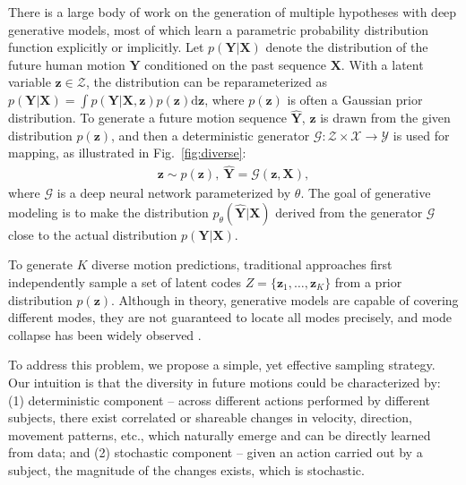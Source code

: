 There is a large body of work on the generation of multiple hypotheses with deep generative models, most of which learn a parametric probability distribution function explicitly or implicitly. Let $p(\mathbf{Y}|\mathbf{X})$ denote the distribution of the future human motion $\mathbf{Y}$ conditioned on the past sequence $\mathbf{X}$. With a latent variable $\mathbf z \in \mathcal{Z}$, the distribution can be reparameterized as $p(\mathbf{Y}|\mathbf{X}) = \int p(\mathbf{Y}|\mathbf{X},\mathbf z)p(\mathbf z) \mathrm{d} \mathbf z$, where $p(\mathbf z)$ is often a Gaussian prior distribution. To generate a future motion sequence $\mathbf{\widehat Y}$, $\mathbf{z}$ is drawn from the given distribution $p(\mathbf z)$, and then a deterministic generator $\mathcal{G}:\mathcal{Z}\times \mathcal{X} \rightarrow \mathcal{Y}$ is used for mapping, as illustrated in Fig.~\ref{fig:diverse}{\color{red}{(a)}}: 
\begin{align}
    \mathbf{z} \sim p(\mathbf{z}), \ \mathbf{\widehat Y} = \mathcal{G}(\mathbf{z}, \mathbf{X}),
\end{align}
where $\mathcal{G}$ is a deep neural network parameterized by $\theta$. The goal of generative modeling is to make the distribution $p_{\theta}(\mathbf{\widehat Y}|\mathbf{X})$ derived from the generator $\mathcal{G}$ close to the actual distribution $p(\mathbf{Y}|\mathbf{X})$. 

To generate $K$ diverse motion predictions, traditional approaches first independently sample a set of latent codes $Z = \{\mathbf{z}_1, \ldots, \mathbf{z}_K\}$ from a prior distribution $p(\mathbf{z})$.
Although in theory, generative models are capable of covering different modes, they are not guaranteed to locate all modes precisely, and mode collapse has been widely observed \cite{yuan2020dlow,Yuan2020Diverse}.

To address this problem, we propose a simple, yet effective sampling strategy. Our intuition is that the diversity in future motions could be characterized by: (1) deterministic component -- across different actions performed by different subjects, there exist correlated or shareable changes in velocity, direction, movement patterns, etc., which naturally emerge and can be directly learned from data; and (2) stochastic component -- given an action carried out by a subject, the magnitude of the changes exists, which is stochastic.

